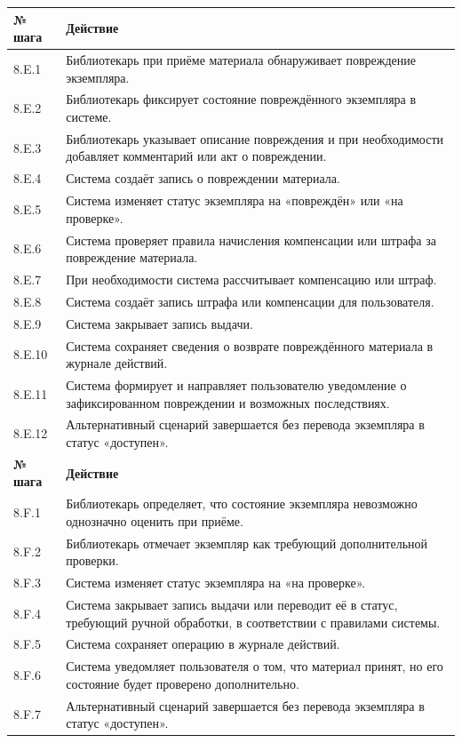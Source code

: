 \documentclass[12pt,a4paper]{article}
\begin{document}
\begin{xltabular}{\textwidth}{
				|>{\raggedright\arraybackslash}p{2.7cm}
				|>{\raggedright\arraybackslash}X|
			}
			\textbf{№ шага} & \textbf{Действие} \\
			\hline
			
			8.E.1 & Библиотекарь при приёме материала обнаруживает повреждение
			экземпляра. \\
			\hline
			8.E.2 & Библиотекарь фиксирует состояние повреждённого экземпляра в
			системе. \\
			\hline
			8.E.3 & Библиотекарь указывает описание повреждения и при необходимости
			добавляет комментарий или акт о повреждении. \\
			\hline
			8.E.4 & Система создаёт запись о повреждении материала. \\
			\hline
			8.E.5 & Система изменяет статус экземпляра на «повреждён» или «на проверке». \\
			\hline
			8.E.6 & Система проверяет правила начисления компенсации или штрафа за
			повреждение материала. \\
			\hline
			8.E.7 & При необходимости система рассчитывает компенсацию или штраф. \\
			\hline
			8.E.8 & Система создаёт запись штрафа или компенсации для пользователя. \\
			\hline
			8.E.9 & Система закрывает запись выдачи. \\
			\hline
			8.E.10 & Система сохраняет сведения о возврате повреждённого материала в
			журнале действий. \\
			\hline
			8.E.11 & Система формирует и направляет пользователю уведомление о
			зафиксированном повреждении и возможных последствиях. \\
			\hline
			8.E.12 & Альтернативный сценарий завершается без перевода экземпляра в статус
			«доступен». \\
			\hline
			
			
			\textbf{№ шага} & \textbf{Действие} \\
			\hline
			
			8.F.1 & Библиотекарь определяет, что состояние экземпляра невозможно
			однозначно оценить при приёме. \\
			\hline
			8.F.2 & Библиотекарь отмечает экземпляр как требующий дополнительной
			проверки. \\
			\hline
			8.F.3 & Система изменяет статус экземпляра на «на проверке». \\
			\hline
			8.F.4 & Система закрывает запись выдачи или переводит её в статус,
			требующий ручной обработки, в соответствии с правилами системы. \\
			\hline
			8.F.5 & Система сохраняет операцию в журнале действий. \\
			\hline
			8.F.6 & Система уведомляет пользователя о том, что материал принят, но его
			состояние будет проверено дополнительно. \\
			\hline
			8.F.7 & Альтернативный сценарий завершается без перевода экземпляра в статус
			«доступен». \\
			\hline
			

\end{xltabular}
\end{document}

